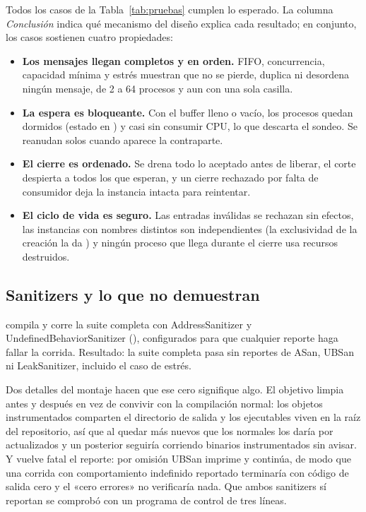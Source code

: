 Todos los casos de la Tabla~\ref{tab:pruebas} cumplen lo esperado. La
columna \emph{Conclusión} indica qué mecanismo del diseño explica cada
resultado; en conjunto, los casos sostienen cuatro propiedades:
\begin{itemize}
  \item \textbf{Los mensajes llegan completos y en orden.} FIFO,
  concurrencia, capacidad mínima y estrés muestran que no se pierde,
  duplica ni desordena ningún mensaje, de 2 a 64 procesos y aun con una
  sola casilla.
  \item \textbf{La espera es bloqueante.} Con el buffer lleno o vacío, los
  procesos quedan dormidos (estado  en ) y casi sin
  consumir CPU, lo que descarta el sondeo. Se reanudan solos cuando
  aparece la contraparte.
  \item \textbf{El cierre es ordenado.} Se drena todo lo aceptado antes de
  liberar, el corte despierta a todos los que esperan, y un cierre
  rechazado por falta de consumidor deja la instancia intacta para
  reintentar.
  \item \textbf{El ciclo de vida es seguro.} Las entradas inválidas se
  rechazan sin efectos, las instancias con nombres distintos son
  independientes (la exclusividad de la creación la da ) y
  ningún proceso que llega durante el cierre usa recursos destruidos.
\end{itemize}

\subsection{Sanitizers y lo que no demuestran}

 compila y corre la suite completa con
AddressSanitizer y UndefinedBehaviorSanitizer
(), configurados para que cualquier
reporte haga fallar la corrida. Resultado: la suite completa pasa sin
reportes de ASan, UBSan ni LeakSanitizer, incluido el caso de estrés.

Dos detalles del montaje hacen que ese cero signifique algo. El objetivo
limpia antes y después en vez de convivir con la compilación normal: los
objetos instrumentados comparten el directorio de salida y los ejecutables
viven en la raíz del repositorio, así que al quedar más nuevos que los
normales  los daría por actualizados y un 
posterior seguiría corriendo binarios instrumentados sin avisar. Y
 vuelve fatal el reporte: por
omisión UBSan imprime y continúa, de modo que una corrida con comportamiento
indefinido reportado terminaría con código de salida cero y el «cero
errores» no verificaría nada. Que ambos sanitizers sí reportan se comprobó
con un programa de control de tres líneas.

